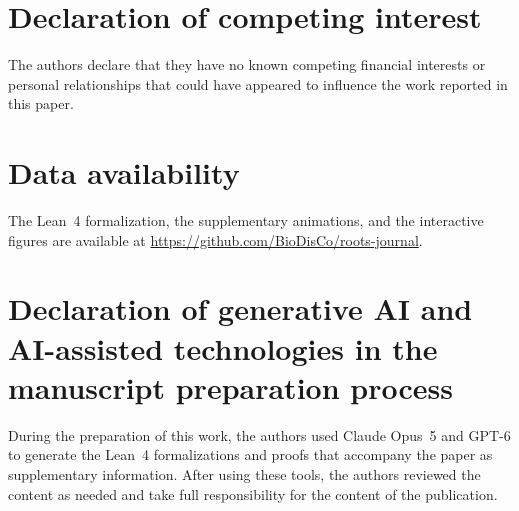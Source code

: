 \documentclass[preprint,12pt,a4paper]{elsarticle}
\theoremstyle{plain}
\theoremstyle{definition}
\begin{document}
\section*{Declaration of competing interest}
The authors declare that they have no known competing financial interests or personal relationships that could have appeared to influence the work reported in this paper.

\section*{Data availability}
The Lean~4 formalization, the supplementary animations, and the interactive figures are available at \url{https://github.com/BioDisCo/roots-journal}.

\section*{Declaration of generative AI and AI-assisted technologies in the manuscript preparation process}
During the preparation of this work, the authors used Claude Opus~5 and GPT-6 to generate the Lean~4 formalizations and proofs that accompany the paper as supplementary information.
After using these tools, the authors reviewed the content as needed and take full responsibility for the content of the publication.




\end{document}
